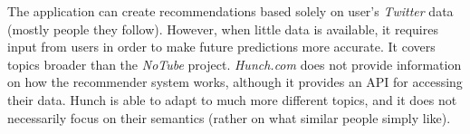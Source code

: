 The application can create recommendations based solely on user's \textit{Twitter} data (mostly people they follow). However, when little data is available, it requires input from users in order to make future predictions more accurate. It covers topics broader than the \textit{NoTube} project.
\textit{Hunch.com} does not provide information on how the recommender system works, although it provides an API for accessing their data.
Hunch is able to adapt to much more different topics, and it does not necessarily focus on their semantics (rather on what similar people simply like).